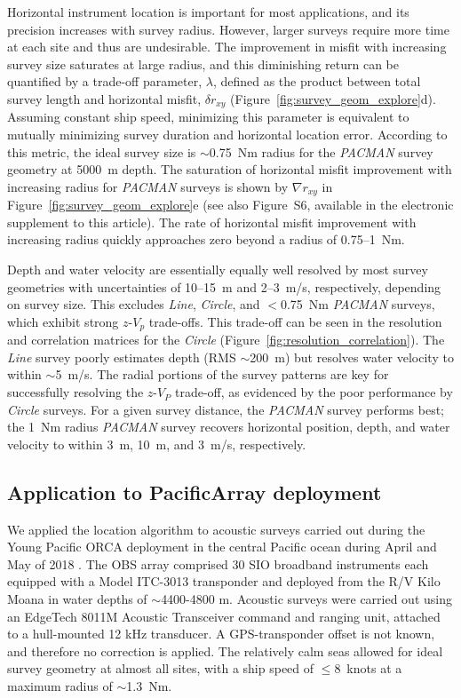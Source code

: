 \documentclass[10pt,titlepage]{article}
\begin{document}
Horizontal instrument location is important for most applications, and its precision increases with survey radius. However, larger surveys require more time at each site and thus are undesirable. The improvement in misfit with increasing survey size saturates at large radius, and this diminishing return can be quantified by a trade-off parameter, $\lambda$, defined as the product between total survey length and horizontal misfit, $\delta r_{xy}$ (Figure~\ref{fig:survey_geom_explore}d). Assuming constant ship speed, minimizing this parameter is equivalent to mutually minimizing survey duration and horizontal location error. According to this metric, the ideal survey size is $\sim$0.75~Nm radius for the \textit{PACMAN} survey geometry at 5000~m depth. The saturation of horizontal misfit improvement with increasing radius for \textit{PACMAN} surveys is shown by $\nabla r_{xy}$ in Figure~\ref{fig:survey_geom_explore}e (see also Figure~S6, available in the electronic supplement to this article). The rate of horizontal misfit improvement with increasing radius quickly approaches zero beyond a radius of 0.75--1~Nm.

Depth and water velocity are essentially equally well resolved by most survey geometries with uncertainties of 10--15~m and 2--3~m/s, respectively, depending on survey size. This excludes \textit{Line}, \textit{Circle}, and $<$0.75~Nm \textit{PACMAN} surveys, which exhibit strong $z$-$V_p$ trade-offs. This trade-off can be seen in the resolution and correlation matrices for the \textit{Circle} (Figure~\ref{fig:resolution_correlation}). The \textit{Line} survey poorly estimates depth (RMS $\sim$200~m) but resolves water velocity to within $\sim$5~m/s. The radial portions of the survey patterns are key for successfully resolving the $z$-$V_P$ trade-off, as evidenced by the poor performance by \textit{Circle} surveys. For a given survey distance, the \textit{PACMAN} survey performs best; the 1~Nm radius \textit{PACMAN} survey recovers horizontal position, depth, and water velocity to within 3~m, 10~m, and 3~m/s, respectively.


\subsection{Application to PacificArray deployment} \label{sec:PacificArray_deployment}
We applied the location algorithm to acoustic surveys carried out during the Young Pacific ORCA deployment in the central Pacific ocean during April and May of 2018 \citep{Gaherty2018}. The OBS array comprised 30 SIO broadband instruments each equipped with a Model ITC-3013 transponder and deployed from the R/V Kilo Moana in water depths of $\sim$4400-4800 m. Acoustic  surveys were carried out using an EdgeTech 8011M Acoustic Transceiver command and ranging unit, attached to a hull-mounted 12 kHz transducer. A GPS-transponder offset is not known, and therefore no correction is applied. The relatively calm seas allowed for ideal survey geometry at almost all sites, with a ship speed of \mbox{$\le$8~knots} at a maximum radius of \mbox{$\sim$1.3~Nm}. 
\end{document}
